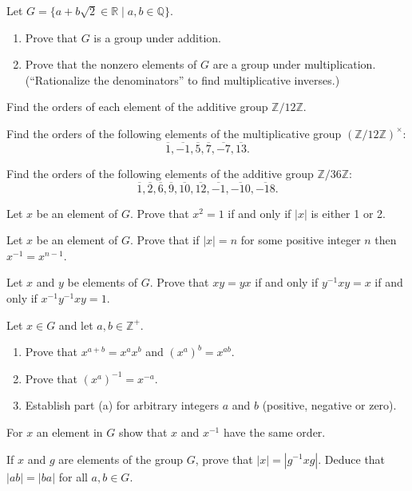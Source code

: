 \begin{questions}
\question
Let \(G=\{a+b \sqrt{2} \in \mathbb{R} \mid a, b \in \mathbb{Q}\}\).
\begin{enumerate}[label=(\alph*)]
    \item Prove that \(G\) is a group under addition.
    \item Prove that the nonzero elements of \(G\) are a group under multiplication. (``Rationalize the denominators'' to find multiplicative inverses.)
\end{enumerate}


\question
Find the orders of each element of the additive group \(\mathbb{Z} / 12 \mathbb{Z}\).

\question
Find the orders of the following elements of the multiplicative group \((\mathbb{Z} / 12 \mathbb{Z})^\times\):
\[\overline{1}, \overline{-1}, \overline{5}, \overline{7}, \overline{-7}, \overline{13}.\]

\question
Find the orders of the following elements of the additive group \(\mathbb{Z} / 36 \mathbb{Z}\):
\[ \overline{1}, \overline{2}, \overline{6}, \overline{9}, \overline{10}, \overline{12}, \overline{-1},\overline{-10},\overline{-18}.\]



\question
Let \(x\) be an element of \(G\). Prove that \(x^2=1\) if and only if \(|x|\) is either 1 or 2.

\question
Let \(x\) be an element of \(G\). Prove that if \(|x|=n\) for some positive integer \(n\) then \(x^{-1}=x^{n-1}\).

\question
Let \(x\) and \(y\) be elements of \(G\). Prove that \(x y=y x\) if and only if \(y^{-1} x y=x\) if and only if \(x^{-1} y^{-1} x y=1\).


\question
Let \(x \in G\) and let \(a, b \in \mathbb{Z}^{+}\).
\begin{enumerate}[label=(\alph*)]
    \item Prove that \(x^{a+b}=x^a x^b \) and \(\left(x^a\right)^b=x^{a b}\).
    \item Prove that \(\left(x^a\right)^{-1}=x^{-a}\).
    \item Establish part (a) for arbitrary integers \(a\) and \(b\) (positive, negative or zero).
\end{enumerate}

\question
For \(x\) an element in \(G\) show that \(x\) and \(x^{-1}\) have the same order.


\question 
If \(x\) and \(g\) are elements of the group \(G\), prove that \(|x|=\left|g^{-1} x g\right|\). Deduce that \(|a b|=|b a|\) for all \(a, b \in G\).


\end{questions}
